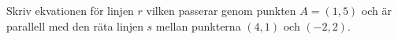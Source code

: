 Skriv ekvationen för linjen $r$ vilken passerar genom punkten $A=(1,5)$ och 
är parallell med den räta linjen $s$ mellan punkterna $(4,1)$ och $(-2,2)$.

